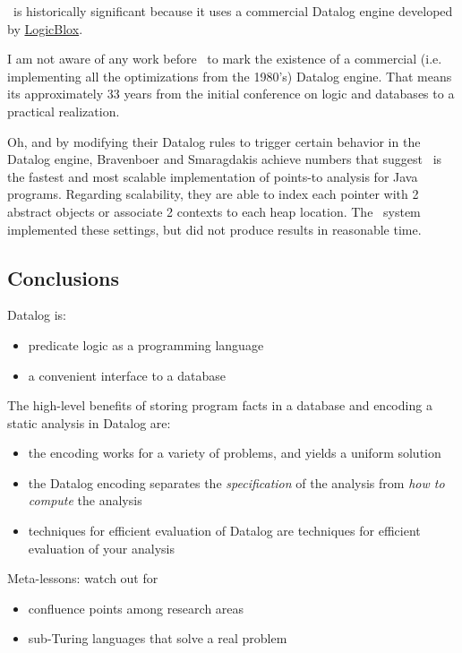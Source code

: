 \documentclass{article}
\begin{document}
\doop\ is historically significant because it uses a commercial Datalog engine developed by \href{http://www.logicblox.com/}{LogicBlox}.

I am not aware of any work before \doop\ to mark the existence of a commercial (i.e. implementing all the optimizations from the 1980's) Datalog engine.
That means its approximately 33 years from the initial conference on logic and databases to a practical realization.

Oh, and by modifying their Datalog rules to trigger certain behavior in the Datalog engine, Bravenboer and Smaragdakis achieve numbers that suggest \doop\ is the fastest and most scalable implementation of points-to analysis for Java programs.
Regarding scalability, they are able to index each pointer with 2 abstract objects or associate 2 contexts to each heap location.
The \paddle\ system implemented these settings, but did not produce results in reasonable time.


\subsection*{Conclusions}

Datalog is:
\begin{itemize}
\item predicate logic as a programming language
\item a convenient interface to a database
\end{itemize}

The high-level benefits of storing program facts in a database and encoding a static analysis in Datalog are:
\begin{itemize}
\item the encoding works for a variety of problems, and yields a uniform solution
\item the Datalog encoding separates the \emph{specification} of the analysis from \emph{how to compute} the analysis
\item techniques for efficient evaluation of Datalog are techniques for efficient evaluation of your analysis
\end{itemize}

Meta-lessons: watch out for
\begin{itemize}
\item confluence points among research areas
\item sub-Turing languages that solve a real problem
\end{itemize}
\end{document}
